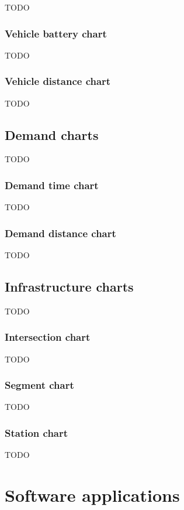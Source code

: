 \documentclass[11pt,twocolumn]{article}
\begin{document}
TODO

\subsubsection{Vehicle battery chart}

TODO

\subsubsection{Vehicle distance chart}

TODO

\subsection{Demand charts}

TODO

\subsubsection{Demand time chart}

TODO

\subsubsection{Demand distance chart}

TODO

\subsection{Infrastructure charts}

TODO

\subsubsection{Intersection chart}

TODO

\subsubsection{Segment chart}

TODO

\subsubsection{Station chart}

TODO

\section{Software applications}
\label{sec:application}
\end{document}

